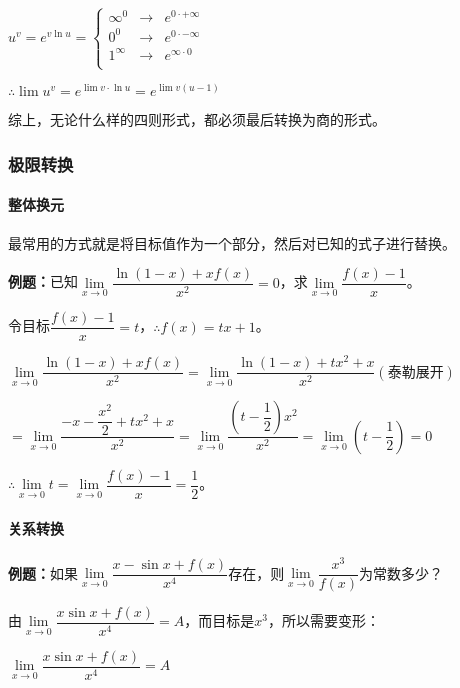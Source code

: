 \documentclass[UTF8, 12pt]{ctexart}
\begin{document}
$
u^v=e^{v\ln u}=\left\{
\begin{array}{lcl}
    \infty^0 & \rightarrow & e^{0\cdot+\infty} \\
    0^0 & \rightarrow & e^{0\cdot-\infty} \\
    1^\infty & \rightarrow & e^{\infty\cdot 0} \\
\end{array} \right.
$

\medskip

$\therefore \lim u^v=e^{\lim v\cdot\ln u}=e^{\lim v(u-1)}$

综上，无论什么样的四则形式，都必须最后转换为商的形式。

\subsubsection{极限转换}

\paragraph{整体换元} \leavevmode \medskip

最常用的方式就是将目标值作为一个部分，然后对已知的式子进行替换。

\textbf{例题：}已知$\lim\limits_{x\to 0}\dfrac{\ln(1-x)+xf(x)}{x^2}=0$，求$\lim\limits_{x\to 0}\dfrac{f(x)-1}{x}$。\medskip

令目标$\dfrac{f(x)-1}{x}=t$，$\therefore f(x)=tx+1$。\medskip

$\lim\limits_{x\to 0}\dfrac{\ln(1-x)+xf(x)}{x^2}=\lim\limits_{x\to 0}\dfrac{\ln(1-x)+tx^2+x}{x^2} (\text{泰勒展开})$\medskip

$=\lim\limits_{x\to 0}\dfrac{-x-\dfrac{x^2}{2}+tx^2+x}{x^2}=\lim\limits_{x\to 0}\dfrac{\left(t-\dfrac{1}{2}\right)x^2}{x^2}=\lim\limits_{x\to 0}\left(t-\dfrac{1}{2}\right)=0$

$\therefore\lim\limits_{x\to 0}t=\lim\limits_{x\to 0}\dfrac{f(x)-1}{x}=\dfrac{1}{2}$。

\paragraph{关系转换} \leavevmode \medskip

\textbf{例题：}如果$\lim\limits_{x\to 0}\dfrac{x-\sin x+f(x)}{x^4}$存在，则$\lim\limits_{x\to 0}\dfrac{x^3}{f(x)}$为常数多少？

由$\lim\limits_{x\to 0}\dfrac{x\sin x+f(x)}{x^4}=A$，而目标是$x^3$，所以需要变形：

$\lim\limits_{x\to 0}\dfrac{x\sin x+f(x)}{x^4}=A$
\end{document}
